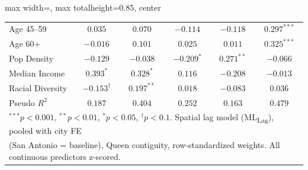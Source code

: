 \begin{table}[htbp]
\begin{adjustbox}{max width=\linewidth, max totalheight=0.85\textheight, center}
\begin{tabular}{lccccc}
Age 45--59 & $0.035$ & $0.070$ & $-0.114$ & $-0.118$ & $0.297^{***}$ \\
Age 60+ & $-0.016$ & $0.101$ & $0.025$ & $0.011$ & $0.325^{***}$ \\
Pop Density & $-0.129$ & $-0.038$ & $-0.209^{*}$ & $0.271^{**}$ & $-0.066$ \\
Median Income & $0.393^{*}$ & $0.328^{*}$ & $0.116$ & $-0.208$ & $-0.013$ \\
Racial Diversity & $-0.153^{\dagger}$ & $0.197^{**}$ & $0.018$ & $-0.083$ & $0.036$ \\
\midrule
Pseudo $R^2$ & $0.187$ & $0.404$ & $0.252$ & $0.163$ & $0.479$ \\
\bottomrule
\multicolumn{6}{l}{\scriptsize $^{***}p<0.001$, $^{**}p<0.01$, $^{*}p<0.05$, $^{\dagger}p<0.1$. Spatial lag model (ML\textsubscript{Lag}), pooled with city FE} \\
\multicolumn{6}{l}{\scriptsize (San Antonio = baseline), Queen contiguity, row-standardized weights. All continuous predictors z-scored.} \\
\end{tabular}
\end{adjustbox}
\end{table}
